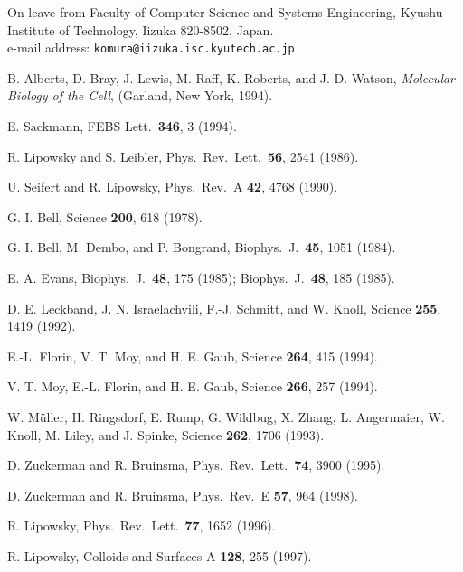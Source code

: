 \begin{references}


On leave from
Faculty of Computer Science and Systems Engineering,
Kyushu Institute of Technology,
Iizuka 820-8502, Japan.  \\
e-mail address: {\tt komura@iizuka.isc.kyutech.ac.jp}


B. Alberts, D. Bray, J. Lewis, M. Raff, K. Roberts, and J. D. Watson,
{\it Molecular Biology of the Cell}, (Garland, New York, 1994).

E. Sackmann,
FEBS Lett.\ {\bf 346}, 3 (1994).

R. Lipowsky and S. Leibler,
Phys.\ Rev.\ Lett.\ {\bf 56}, 2541 (1986).

U. Seifert and R. Lipowsky,
Phys.\ Rev.\ A {\bf 42}, 4768 (1990).

G. I. Bell,
Science {\bf 200}, 618 (1978).

G. I. Bell, M. Dembo, and P. Bongrand,
Biophys.\ J.\ {\bf 45}, 1051 (1984).

E. A. Evans,
Biophys.\ J.\ {\bf 48}, 175 (1985);
Biophys.\ J.\ {\bf 48}, 185 (1985).

D. E. Leckband, J. N. Israelachvili, F.-J. Schmitt, and W. Knoll,
Science {\bf 255}, 1419 (1992).

E.-L. Florin, V. T. Moy, and H. E. Gaub,
Science {\bf 264}, 415 (1994).

V. T. Moy, E.-L. Florin, and H. E. Gaub,
Science {\bf 266}, 257 (1994).

W. M\"uller, H. Ringsdorf, E. Rump, G. Wildbug, X. Zhang, L.
Angermaier, W. Knoll, M. Liley, and J. Spinke,
Science {\bf 262}, 1706 (1993).

D. Zuckerman and R. Bruinsma,
Phys.\ Rev.\ Lett.\ {\bf 74}, 3900 (1995).

D. Zuckerman and R. Bruinsma,
Phys.\ Rev.\ E {\bf 57}, 964 (1998).

R. Lipowsky,
Phys.\ Rev.\ Lett.\ {\bf 77}, 1652 (1996).

R. Lipowsky,
Colloids and Surfaces A {\bf 128}, 255 (1997).


\end{references}
